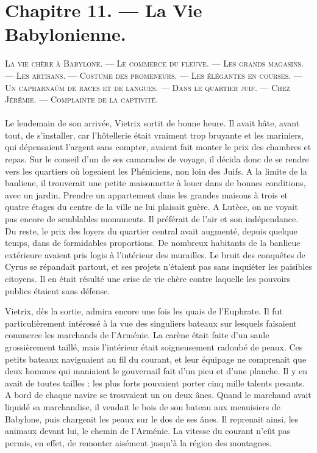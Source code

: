 \documentclass[a4paper, 11pt, oneside, polutonikogreek, french]{article}
\begin{document}
\section{Chapitre 11. --- La Vie Babylonienne.}
\begin{center}
\scshape
\small
La vie chère à Babylone. --- Le commerce du fleuve. --- Les grands magasins. --- Les artisans. --- Costume des promeneurs. --- Les élégantes en courses. --- Un capharnaüm de races et de langues. --- Dans le quartier juif. --- Chez Jérémie. --- Complainte de la captivité.
\end{center}
\paragraph{}
Le lendemain de son arrivée, Vietrix sortit de bonne heure. Il avait hâte, avant tout, de s'installer, car l'hôtellerie était vraiment trop bruyante et les mariniers, qui dépensaient l'argent sans compter, avaient fait monter le prix des chambres et repas. Sur le conseil d'un de ses camarades de voyage, il décida donc de se rendre vers les quartiers où logeaient les Phéniciens, non loin des Juifs. A la limite de la banlieue, il trouverait une petite maisonnette à louer dans de bonnes conditions, avec un jardin. Prendre un appartement dans les grandes maisons à trois et quatre étages du centre de la ville ne lui plaisait guère. A Lutèce, on ne voyait pas encore de semblables monuments. Il préférait de l'air et son indépendance. Du reste, le prix des loyers du quartier central avait augmenté, depuis quelque temps, dans de formidables proportions. De nombreux habitants de la banlieue extérieure avaient pris logis à l'intérieur des murailles. Le bruit des conquêtes de Cyrus se répandait partout, et ses projets n'étaient pas sans inquiéter les paisibles citoyens. Il en était résulté une crise de vie chère contre laquelle les pouvoirs publics étaient sans défense.

\bigskip
\centerline{\EightStarTaper}
\centerline{\EightStarTaper\EightStarTaper}
\bigskip

Vietrix, dès la sortie, admira encore une fois les quais de l'Euphrate. Il fut particulièrement intéressé à la vue des singuliers bateaux sur lesquels faisaient commerce les marchands de l'Arménie. La carène était faite d'un saule grossièrement taillé, mais l'intérieur était soigneusement radoubé de peaux. Ces petits bateaux naviguaient au fil du courant, et leur équipage ne comprenait que deux hommes qui maniaient le gouvernail fait d'un pieu et d'une planche. Il y en avait de toutes tailles : les plus forts pouvaient porter cinq mille talents pesants. A bord de chaque navire se trouvaient un ou deux ânes. Quand le marchand avait liquidé sa marchandise, il vendait le bois de son bateau aux menuisiers de Babylone, puis chargeait les peaux sur le dos de ses ânes. Il reprenait ainsi, les animaux devant lui, le chemin de l'Arménie. La vitesse du courant n'eût pas permis, en effet, de remonter aisément jusqu'à la région des montagnes.
\end{document}
